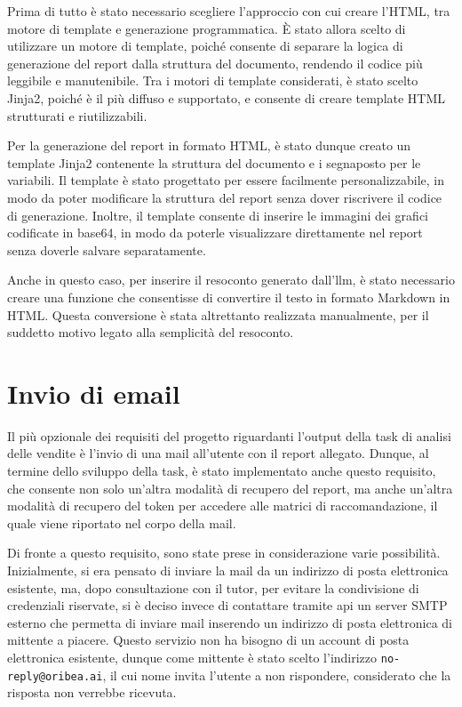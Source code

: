 Prima di tutto è stato necessario scegliere l'approccio con cui creare l'HTML, tra motore di template e generazione programmatica. È stato allora scelto di utilizzare un motore di template, poiché consente di separare la logica di generazione del report dalla struttura del documento, rendendo il codice più leggibile e manutenibile. Tra i motori di template considerati, è stato scelto Jinja2, poiché è il più diffuso e supportato, e consente di creare template HTML strutturati e riutilizzabili.

Per la generazione del report in formato HTML, è stato dunque creato un template Jinja2 contenente la struttura del documento e i segnaposto per le variabili. Il template è stato progettato per essere facilmente personalizzabile, in modo da poter modificare la struttura del report senza dover riscrivere il codice di generazione. Inoltre, il template consente di inserire le immagini dei grafici codificate in base64, in modo da poterle visualizzare direttamente nel report senza doverle salvare separatamente.

Anche in questo caso, per inserire il resoconto generato dall'\gls{llm}, è stato necessario creare una funzione che consentisse di convertire il testo in formato Markdown in HTML. Questa conversione è stata altrettanto realizzata manualmente, per il suddetto motivo legato alla semplicità del resoconto.


\section{Invio di email}

Il più opzionale dei requisiti del progetto riguardanti l'output della task di analisi delle vendite è l'invio di una mail all'utente con il report allegato. Dunque, al termine dello sviluppo della task, è stato implementato anche questo requisito, che consente non solo un'altra modalità di recupero del report, ma anche un'altra modalità di recupero del token per accedere alle matrici di raccomandazione, il quale viene riportato nel corpo della mail.

Di fronte a questo requisito, sono state prese in considerazione varie possibilità.
Inizialmente, si era pensato di inviare la mail da un indirizzo di posta elettronica esistente, ma, dopo consultazione con il tutor, per evitare la condivisione di credenziali riservate, si è deciso invece di contattare tramite \gls{api} un server SMTP esterno che permetta di inviare mail inserendo un indirizzo di posta elettronica di mittente a piacere. Questo servizio non ha bisogno di un account di posta elettronica esistente, dunque come mittente è stato scelto l'indirizzo \texttt{no-reply@oribea.ai}, il cui nome invita l'utente a non rispondere, considerato che la risposta non verrebbe ricevuta.

